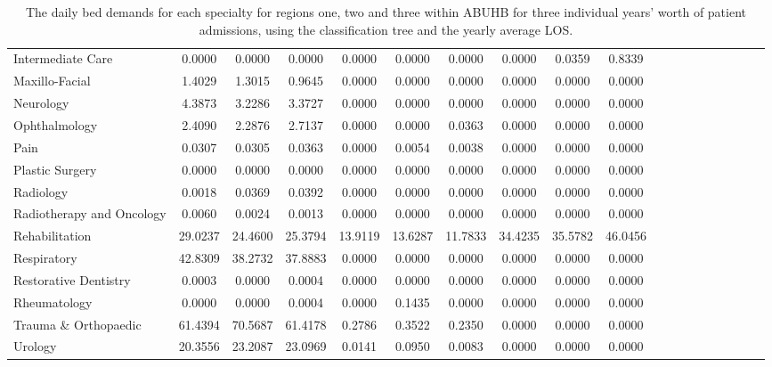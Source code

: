 \documentclass[thesis.tex]{subfiles}
\begin{document}
\begin{landscape}
\begin{table}[h!]
{\begin{tabular}{lcccccccccccccccccc}
Intermediate Care	&0.0000&	0.0000&	0.0000&	0.0000&	0.0000&	0.0000&	0.0000&	0.0359&	0.8339\\
Maxillo-Facial&	1.4029&	1.3015&	0.9645&	0.0000&	0.0000&	0.0000&	0.0000&	0.0000&	0.0000\\
Neurology&	4.3873&	3.2286&	3.3727&	0.0000&	0.0000&	0.0000&	0.0000&	0.0000&	0.0000\\
Ophthalmology&	2.4090&	2.2876&	2.7137&	0.0000&	0.0000&	0.0363&	0.0000&	0.0000&	0.0000\\
Pain&	0.0307&	0.0305&	0.0363&	0.0000&	0.0054&	0.0038&	0.0000&	0.0000&	0.0000\\
Plastic Surgery	&0.0000&	0.0000&	0.0000&	0.0000&	0.0000&	0.0000&	0.0000&	0.0000&	0.0000\\
Radiology&	0.0018&	0.0369&	0.0392&	0.0000&	0.0000&	0.0000&	0.0000&	0.0000&	0.0000\\
Radiotherapy and Oncology&	0.0060&	0.0024&	0.0013&	0.0000&	0.0000&	0.0000&	0.0000&	0.0000&	0.0000\\
Rehabilitation&	29.0237&	24.4600&	25.3794&	13.9119&	13.6287&	11.7833&	34.4235&	35.5782&	46.0456\\
Respiratory&	42.8309&	38.2732&	37.8883&	0.0000&	0.0000&	0.0000&	0.0000&	0.0000&	0.0000\\
Restorative Dentistry	&0.0003&	0.0000&	0.0004&	0.0000&	0.0000&	0.0000&	0.0000&	0.0000&	0.0000\\
Rheumatology&	0.0000&	0.0000&	0.0004&	0.0000&	0.1435&	0.0000&	0.0000&	0.0000&	0.0000\\
Trauma \& Orthopaedic&	61.4394&	70.5687&	61.4178&	0.2786&	0.3522&	0.2350&	0.0000&	0.0000&	0.0000\\
Urology&	20.3556&	23.2087&	23.0969&	0.0141&	0.0950&	0.0083&	0.0000&	0.0000&	0.0000\\

\bottomrule
\end{tabular}  } 
\caption{The daily bed demands for each specialty for regions one, two and three within ABUHB for three individual years’ worth of patient admissions, using the classification tree and the yearly average LOS.}
    \label{apptab:LinkedDemands8a}
\end{table}  



\begin{table}[h!]
    \centering{}
\end{table}
\end{landscape}
\end{document}
